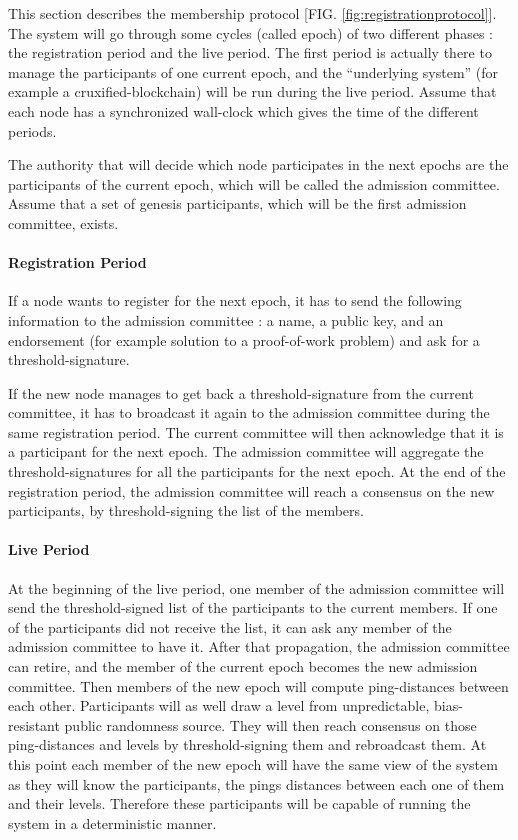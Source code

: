\documentclass[a4paper,11pt,oneside]{report}
\begin{document}
This section describes the membership protocol [FIG. \autoref{fig:registrationprotocol}].
The system will go through some cycles (called epoch) of two different phases :
the registration period and the live period. The first period is actually there
to manage the participants of one current epoch, and the “underlying system”
(for example a cruxified-blockchain) will be run during the live period. Assume
that each node has a synchronized wall-clock which gives the time of the
different periods.

The authority that will decide which node participates in the next epochs are
the participants of the current epoch, which will be called the admission
committee. Assume that a set of genesis participants, which will be the first
admission committee, exists.

\paragraph{Registration Period}
If a node wants to register for the next epoch, it has to send the following
information to the admission committee : a name, a public key, and an
endorsement (for example solution to a proof-of-work problem) and ask for a
threshold-signature. 

If the new node manages to get back a threshold-signature from the current
committee, it has to broadcast it again to the admission committee during the
same registration period. The current committee will then acknowledge that it
is a participant for the next epoch. The admission committee will aggregate the
threshold-signatures for all the participants for the next epoch. At the end of
the registration period, the admission committee will reach a consensus on the
new participants, by threshold-signing the list of the members.  

\paragraph{Live Period}
At the beginning of the live period, one member of the admission committee will
send the threshold-signed list of the participants to the current members. If
one of the participants did not receive the list, it can ask any member of the
admission committee to have it. After that propagation, the admission committee
can retire, and the member of the current epoch becomes the new admission
committee. Then members of the new epoch will compute ping-distances between
each other. Participants will as well draw a level from unpredictable,
bias-resistant public randomness source. They will then reach consensus on
those ping-distances and levels by threshold-signing them and rebroadcast them.
At this point each member of the new epoch will have the same view of the
system as they will know the participants, the pings distances between each one
of them and their levels. Therefore these participants will be capable of
running the system in a deterministic manner.
\end{document}
